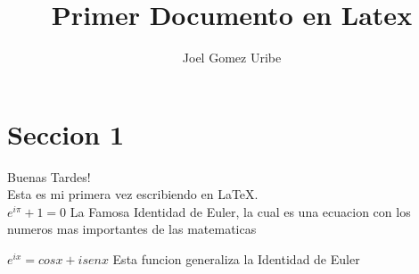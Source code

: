 \documentclass[a4paper,10pt]{article}
\title{Primer Documento en Latex} %
\author{Joel Gomez Uribe} %
\begin{document}
\maketitle

% 

\section{Seccion 1}

Buenas Tardes! \\ %
Esta es mi primera vez escribiendo en \LaTeX.\\ %

$ e^{i \pi} + 1 = 0 $ La Famosa Identidad de Euler, la cual es una ecuacion con los numeros mas importantes de las matematicas  %

$ e^{i x} = cos x + i sen x $ Esta funcion generaliza la Identidad de Euler
\end{document}
